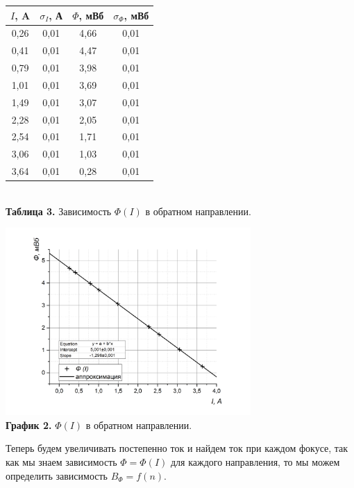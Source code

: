 \documentclass[a4paper, 12pt]{article}%
\begin{document}
  \begin{center}
\begin{tabular}{|c|c|c|c|}
\hline
$I$, A & $\sigma_I$, А & $\Phi$, мВб & $\sigma_{\Phi}$, мВб \\ \hline
0,26 & 0,01 & 4,66 & 0,01 \\ \hline
0,41 & 0,01 & 4,47 & 0,01 \\ \hline
0,79 & 0,01 & 3,98 & 0,01 \\ \hline
1,01 & 0,01 & 3,69 & 0,01 \\ \hline
1,49 & 0,01 & 3,07 & 0,01 \\ \hline
2,28 & 0,01 & 2,05 & 0,01 \\ \hline
2,54 & 0,01 & 1,71 & 0,01 \\ \hline
3,06 & 0,01 & 1,03 & 0,01 \\ \hline
3,64 & 0,01 & 0,28 & 0,01 \\ \hline
\end{tabular}\\
\textbf{Таблица 3.} Зависимость $\Phi (I)$ в обратном направлении.
  \end{center} 
 \begin{center}
    \includegraphics[width = 0.7\textwidth]{4.jpg}\\
  \textbf{График 2.} $\Phi (I)$ в обратном направлении.
  \end{center}
Теперь будем увеличивать постепенно ток и найдем ток при каждом фокусе, так как мы знаем зависимость $\Phi = \Phi(I)$ для каждого направления, то мы можем определить зависимость $B_{\Phi} = f(n)$.
\end{document}
